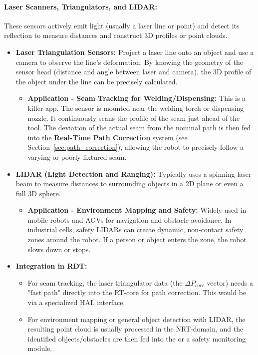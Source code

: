     \paragraph{\textbf{Laser Scanners, Triangulators, and LIDAR:}}
    These sensors actively emit light (usually a laser line or point) and detect its reflection to measure distances and construct 3D profiles or point clouds.
    \begin{itemize}
        \item \textbf{Laser Triangulation Sensors:} Project a laser line onto an object and use a camera to observe the line's deformation. By knowing the geometry of the sensor head (distance and angle between laser and camera), the 3D profile of the object under the line can be precisely calculated.
            \begin{itemize}
                \item \textbf{Application - Seam Tracking for Welding/Dispensing:} This is a killer app. The sensor is mounted near the welding torch or dispensing nozzle. It continuously scans the profile of the seam just ahead of the tool. The deviation of the actual seam from the nominal path is then fed into the \textbf{Real-Time Path Correction} system (see Section~\ref{sec:path_correction}), allowing the robot to precisely follow a varying or poorly fixtured seam.
            \end{itemize}
        \item \textbf{LIDAR (Light Detection and Ranging):} Typically uses a spinning laser beam to measure distances to surrounding objects in a 2D plane or even a full 3D sphere.
            \begin{itemize}
                \item \textbf{Application - Environment Mapping and Safety:} Widely used in mobile robots and AGVs for navigation and obstacle avoidance. In industrial cells, safety LIDARs can create dynamic, non-contact safety zones around the robot. If a person or object enters the zone, the robot slows down or stops.
            \end{itemize}
        \item \textbf{Integration in RDT:}
            \begin{itemize}
                \item For seam tracking, the laser triangulator data (the \(\Delta P_{corr}\) vector) needs a "fast path" directly into the RT-core for path correction. This would be via a specialized  HAL interface.
                \item For environment mapping or general object detection with LIDAR, the resulting point cloud is usually processed in the NRT-domain, and the identified objects/obstacles are then fed into the  or a safety monitoring module.
            \end{itemize}
    \end{itemize}

